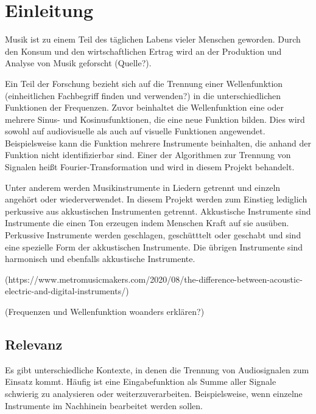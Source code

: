 \chapter{Einleitung}
%

Musik ist zu einem Teil des täglichen Labens vieler Menschen geworden. Durch den Konsum und den wirtschaftlichen Ertrag wird an der Produktion und Analyse von Musik geforscht (Quelle?).

\par

Ein Teil der Forschung bezieht sich auf die Trennung einer Wellenfunktion (einheitlichen Fachbegriff finden und verwenden?) in die unterschiedlichen Funktionen der Frequenzen. Zuvor beinhaltet die Wellenfunktion eine oder mehrere Sinus- und Kosinusfunktionen, die eine neue Funktion bilden. Dies wird sowohl auf audiovisuelle als auch auf visuelle Funktionen angewendet. Beispielsweise kann die Funktion mehrere Instrumente beinhalten, die anhand der Funktion nicht identifizierbar sind. Einer der Algorithmen zur Trennung von Signalen heißt Fourier-Transformation und wird in diesem Projekt behandelt.

\par

Unter anderem werden Musikinstrumente in Liedern getrennt und einzeln angehört oder wiederverwendet. In diesem Projekt werden zum Einstieg lediglich perkussive aus akkustischen Instrumenten getrennt. Akkustische Instrumente sind Instrumente die einen Ton erzeugen indem Menschen Kraft auf sie ausüben. Perkussive Instrumente werden geschlagen, geschütttelt oder geschabt und sind eine spezielle Form der akkustischen Instrumente. Die übrigen Instrumente sind harmonisch und ebenfalls akkustische Instrumente.

(https://www.metromusicmakers.com/2020/08/the-difference-between-acoustic-electric-and-digital-instruments/)

%
(Frequenzen und Wellenfunktion woanders erklären?)
%

%
\section{Relevanz}
%

Es gibt unterschiedliche Kontexte, in denen die Trennung von Audiosignalen zum Einsatz kommt. Häufig ist eine Eingabefunktion als Summe aller Signale schwierig zu analysieren oder weiterzuverarbeiten. Beispielsweise, wenn einzelne Instrumente im Nachhinein bearbeitet werden sollen.

